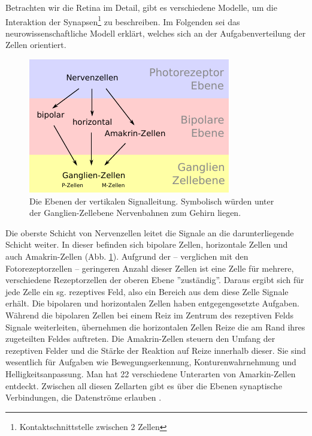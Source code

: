 \documentclass[12pt,a4paper]{article}
\newcommand{\Se}[1]{S. #1}
\newcommand{\fig}[1]{Abb. #1}
\begin{document}
Betrachten wir die Retina im Detail, gibt es verschiedene Modelle, um die
Interaktion der Synapsen\footnote{Kontaktschnittstelle zwischen 2 Zellen}
zu beschreiben. Im Folgenden sei das neurowissenschaftliche Modell erklärt,
welches sich an der Aufgabenverteilung der Zellen orientiert.

\newpage
\begin{figure}
  \begin{center}
    \includegraphics{imgs/layers_without_gradients.pdf}
    \caption[Die Ebenen der vertikalen Signalleitung]
        {Die Ebenen der vertikalen Signalleitung. Symbolisch
        würden unter der Ganglien-Zellebene Nervenbahnen zum Gehirn
        liegen.}
    \label{img:layers}
  \end{center}
\end{figure}

Die oberste Schicht von Nervenzellen leitet die Signale an die darunterliegende
Schicht weiter. In dieser befinden sich bipolare Zellen, horizontale Zellen
und auch Amakrin-Zellen (\fig{\ref{img:layers}}). Aufgrund der -- verglichen
mit den Fotorezeptorzellen -- geringeren Anzahl dieser Zellen ist eine Zelle
für mehrere, verschiedene Rezeptorzellen der oberen Ebene ''zuständig''.
Daraus ergibt sich für jede Zelle ein sg. rezeptives Feld, also ein Bereich
aus dem diese Zelle Signale erhält. Die bipolaren und horizontalen Zellen
haben entgegengesetzte Aufgaben. Während die bipolaren Zellen bei einem Reiz
im Zentrum des rezeptiven Felds Signale weiterleiten, übernehmen die
horizontalen Zellen Reize die am Rand ihres zugeteilten Feldes auftreten. Die
Amakrin-Zellen \cite[\Se{2}]{retinapathways} steuern den Umfang der rezeptiven
Felder und die Stärke der Reaktion auf Reize innerhalb dieser. Sie sind
wesentlich für Aufgaben wie Bewegungserkennung, Konturenwahrnehmung und
Helligkeitsanpassung. Man hat 22 verschiedene Unterarten von Amarkin-Zellen
entdeckt. Zwischen all diesen Zellarten gibt es über die Ebenen synaptische
Verbindungen, die Datenströme erlauben \cite{vim}.
\end{document}
